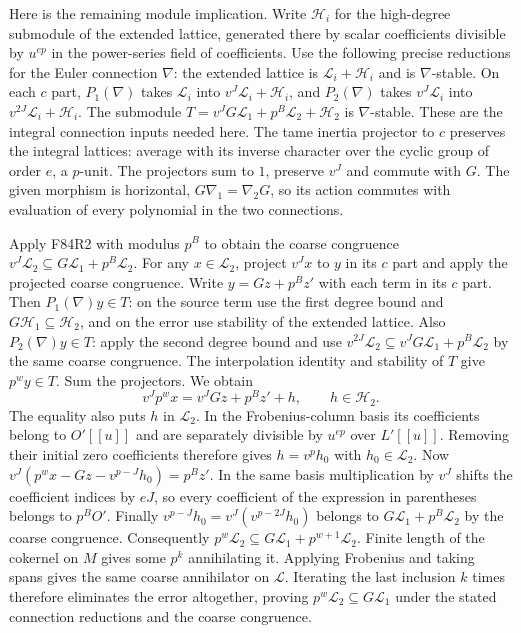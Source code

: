 Here is the remaining module implication. Write $\mathcal H_i$ for the
high-degree submodule of the extended lattice, generated there
by scalar coefficients divisible by $u^{ep}$ in the power-series
field of coefficients. Use the following precise reductions for
the Euler connection $\nabla$: the extended lattice is
$\mathcal L_i+\mathcal H_i$ and is $\nabla$-stable. On each $c$
part, $P_1(\nabla)$ takes $\mathcal L_i$ into
$v^J\mathcal L_i+\mathcal H_i$, and $P_2(\nabla)$ takes
$v^J\mathcal L_i$ into $v^{2J}\mathcal L_i+\mathcal H_i$.
The submodule
$T=v^JG\mathcal L_1+p^B\mathcal L_2+\mathcal H_2$ is
$\nabla$-stable. These are the integral connection inputs needed here.
The tame inertia projector to $c$ preserves the integral lattices:
average with its inverse character over the cyclic group of order
$e$, a $p$-unit. The projectors sum to $1$, preserve $v^J$ and
commute with $G$. The given morphism is horizontal,
$G\nabla_1=\nabla_2G$, so its action commutes with evaluation of
every polynomial in the two connections.

Apply F84R2 with modulus $p^B$ to obtain the coarse congruence $v^J\mathcal L_2\subseteq
G\mathcal L_1+p^B\mathcal L_2$. For any $x\in\mathcal L_2$, project
$v^J x$ to $y$ in its $c$ part and apply the projected coarse
congruence. Write $y=Gz+p^Bz'$ with each term in its $c$ part.
Then $P_1(\nabla)y\in T$: on the source term use the first degree
bound and $G\mathcal H_1\subseteq\mathcal H_2$, and on the error
use stability of the extended lattice. Also $P_2(\nabla)y\in T$:
apply the second degree bound and use
$v^{2J}\mathcal L_2\subseteq v^JG\mathcal L_1+p^B\mathcal L_2$
by the same coarse congruence. The interpolation identity and
stability of $T$ give $p^w y\in T$. Sum the projectors. We obtain
\[
       v^J p^w x=v^J Gz+p^B z'+h,\qquad h\in\mathcal H_2 .
\]
The equality also puts $h$ in $\mathcal L_2$. In the Frobenius-column
basis its coefficients belong to $O'[[u]]$ and are separately
divisible by $u^{ep}$ over $L'[[u]]$. Removing their initial zero
coefficients therefore gives $h=v^ph_0$ with $h_0\in\mathcal L_2$.
Now $v^J(p^wx-Gz-v^{p-J}h_0)=p^Bz'$. In the same basis multiplication
by $v^J$ shifts the coefficient indices by $eJ$, so every coefficient
of the expression in parentheses belongs to $p^BO'$. Finally
$v^{p-J}h_0=v^J(v^{p-2J}h_0)$ belongs to
$G\mathcal L_1+p^B\mathcal L_2$ by the coarse congruence.
Consequently $p^w\mathcal L_2\subseteq G\mathcal L_1+
p^{w+1}\mathcal L_2$. Finite length of the cokernel on $M$ gives
some $p^k$ annihilating it. Applying Frobenius and taking spans
gives the same coarse annihilator on $\mathcal L$. Iterating the
last inclusion $k$ times therefore eliminates the error altogether,
proving $p^w\mathcal L_2\subseteq G\mathcal L_1$ under the stated
connection reductions and the coarse congruence.
